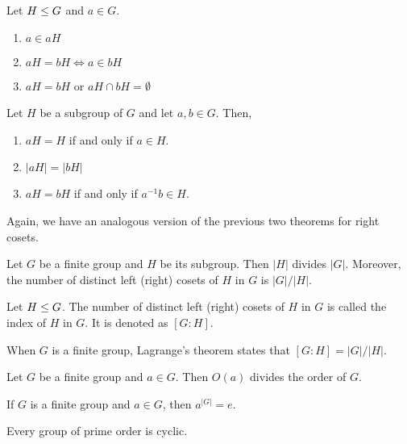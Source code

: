 \documentclass[11pt]{penrose}
\begin{document}
\begin{nthm}\label{thm:coset-properties-a}
    Let $H \mathrel{\leq} G$ and $a \in G$.
    \begin{enumerate}
        \item $a \in aH$
        \item $aH = bH \iff a \in bH$
        \item $aH = bH$ or $aH \cap bH = \emptyset$
    \end{enumerate}
\end{nthm}

\begin{nthm}
    Let $H$ be a subgroup of $G$ and let $a, b \in G$. Then,
    \begin{enumerate}
        \item $aH = H$ if and only if $a \in H$.
        \item $|aH| = |bH|$
        \item $aH = bH$ if and only if $a^{-1} b \in H$.
    \end{enumerate}
\end{nthm}

Again, we have an analogous version of the previous two theorems for right cosets.

\begin{nthm}[Lagrange]
    Let $G$ be a finite group and $H$ be its subgroup. Then $|H|$ divides $|G|$. Moreover, the number of distinct left (right) cosets of $H$ in $G$ is $|G|/|H|$.
\end{nthm}

\begin{ndfn}
    Let $H \mathrel{\leq} G$. The number of distinct left (right) cosets of $H$ in $G$ is called the index of $H$ in $G$. It is denoted as $[G:H]$.
\end{ndfn}

When $G$ is a finite group, Lagrange's theorem states that $[G:H] = |G|/|H|$.

\begin{ncor}\label{cor:lagrange-element-order}
    Let $G$ be a finite group and $a \in G$. Then $O(a)$ divides the order of $G$.
\end{ncor}

\begin{ncor}
    If $G$ is a finite group and $a \in G$, then $a^{|G|} = e$.
\end{ncor}

\begin{ncor}
    Every group of prime order is cyclic.
\end{ncor}
\end{document}
